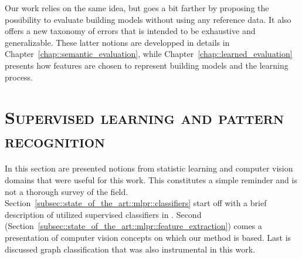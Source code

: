         Our work relies on the same idea, but goes a bit farther by proposing the possibility to evaluate building models without using any reference data.
        It also offers a new taxonomy of errors that is intended to be exhaustive and generalizable.
        These latter notions are developped in details in Chapter~\ref{chap::semantic_evaluation}, while Chapter~\ref{chap::learned_evaluation} presents how features are chosen to represent building models and the learning process.

\section{\textsc{Supervised learning and pattern recognition}}
    \label{sec::state_of_the_art::mlpr}
    In this section are presented notions from statistic learning and computer vision domains that were useful for this work.
    This constitutes a simple reminder and is not a thorough survey of the field.
    Section~\ref{subsec::state_of_the_art::mlpr::classifiers} start off with a brief description of utilized supervised classifiers in .
    Second (Section~\ref{subsec::state_of_the_art::mlpr::feature_extraction}) comes a presentation of computer vision concepts on which our method is based.
    Last is discussed graph classification that was also instrumental in this work.

